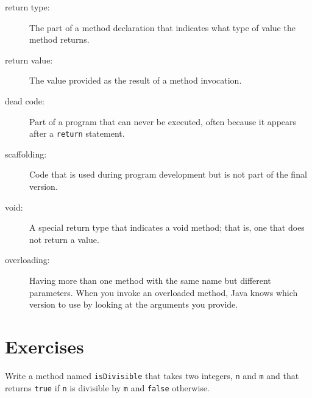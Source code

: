 \begin{description}

\item[return type:]  The part of a method declaration that indicates
what type of value the method returns.

\item[return value:]  The value provided as the result of a method
invocation.

\item[dead code:]  Part of a program that can never be executed,
often because it appears after a {\tt return} statement.

\item[scaffolding:]  Code that is used during program development
but is not part of the final version.

\item[void:]  A special return type that indicates a void method;
that is, one that does not return a value.

\item[overloading:]  Having more than one method with the same name
but different parameters.  When you invoke an overloaded method,
Java knows which version to use by looking at the arguments you
provide.



\end{description}


\section{Exercises}

\begin{exercise}
\label{ex.isdiv}

Write a method named {\tt isDivisible} that takes
two integers, {\tt n} and {\tt m} and that returns {\tt true}
if {\tt n} is divisible by {\tt m} and {\tt false} otherwise.

\end{exercise}


